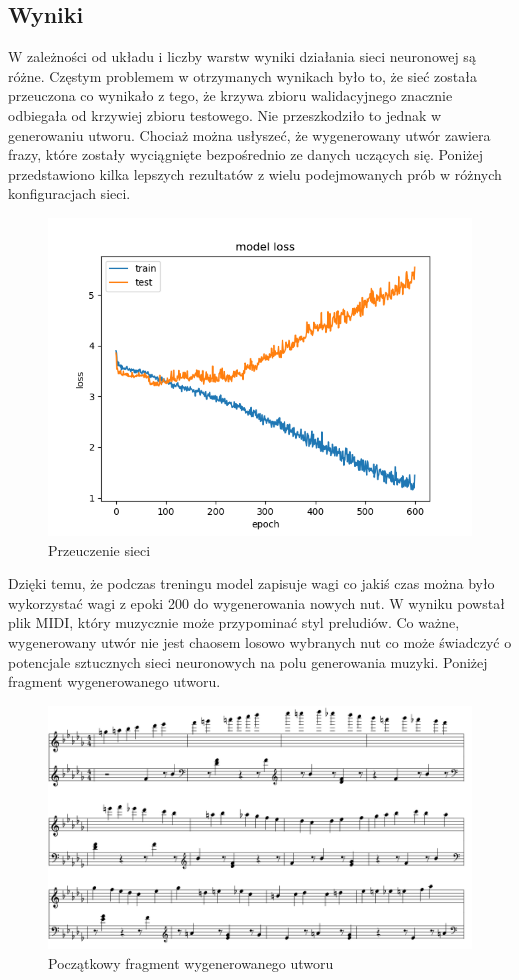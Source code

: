 	\subsection{Wyniki}
	
	W zależności od układu i liczby warstw wyniki działania sieci neuronowej są różne. Częstym problemem w otrzymanych wynikach było to, że sieć została przeuczona co wynikało z tego, że krzywa zbioru walidacyjnego znacznie odbiegała od krzywiej zbioru testowego. Nie przeszkodziło to jednak w generowaniu utworu. Chociaż można usłyszeć, że wygenerowany utwór zawiera frazy, które zostały wyciągnięte bezpośrednio ze danych uczących się. Poniżej przedstawiono kilka lepszych rezultatów z wielu podejmowanych prób w różnych konfiguracjach sieci. 
	
	\begin{figure}[H]
		\centering
		\includegraphics[width=0.5\linewidth]{uWq2G}
		\caption{Przeuczenie sieci}
		\label{fig:uwq2g}
	\end{figure}
	Dzięki temu, że podczas treningu model zapisuje wagi co jakiś czas można było wykorzystać wagi z epoki 200 do wygenerowania nowych nut. W wyniku powstał plik MIDI, który muzycznie może przypominać styl preludiów. Co ważne, wygenerowany utwór nie jest chaosem losowo wybranych nut co może świadczyć o potencjale sztucznych sieci neuronowych na polu generowania muzyki. Poniżej fragment wygenerowanego utworu. 
	\begin{figure}[H]
		\centering
		\includegraphics[width=0.7\linewidth]{wygenerowane_preludium}
		\caption{Początkowy fragment wygenerowanego utworu}
		\label{fig:wygenerowanepreludium}
	\end{figure}

